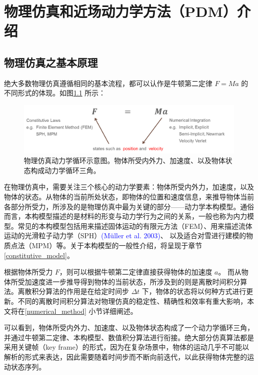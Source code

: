 ﻿\chapter{物理仿真和近场动力学方法（PDM）介绍}

\section{物理仿真之基本原理}
绝大多数物理仿真遵循相同的基本流程，都可以认作是牛顿第二定律 $F = Ma$ 的不同形式的体现。如图\ref{fig_physically_based_animation} 所示：
\begin{figure}[htbp!]
  \centering
  \captionsetup{justification=centering}
  \includegraphics[width=\linewidth]{chap/image/physically_based_animation}

  \caption{\label{fig_physically_based_animation}
           物理仿真动力学循环示意图。物体所受内外力、加速度、以及物体状态构成动力学循环三角。
          }
\end{figure}

在物理仿真中，需要关注三个核心的动力学要素：物体所受内外力，加速度，以及物体的状态。从物体的当前所处状态，即物体的位置和速度信息，来推导物体当前各部分所受力，所涉及的是物理仿真中最为关键的部分——动力学本构模型。通俗而言，本构模型描述的是材料的形变与动力学行为之间的关系，一般也称为内力模型。常见的本构模型包括用来描述固体运动的有限元方法（FEM）、用来描述流体运动的光滑粒子动力学（SPH）\textcolor{blue}{(M\"{u}ller et al. 2003)\supercite{Muller2003}}、 以及适合对雪进行建模的物质点法（MPM）等。关于本构模型的一般性介绍，将呈现于章节\ref{constitutive_model}。

根据物体所受力 $F$，则可以根据牛顿第二定律直接获得物体的加速度 $a$。 而从物体所受加速度进一步推导得到物体的当前状态，所涉及到的则是离散时间积分算法。离散积分算法的作用是在给定时间步 $\Delta t$ 下，物体的状态将以何种方式进行更新。不同的离散时间积分算法对物理仿真的稳定性、精确性和效率有重大影响，本文将在\ref{numerical_method} 小节详细阐述。

可以看到，物体所受内外力、加速度、以及物体状态构成了一个动力学循环三角，并通过牛顿第二定律、本构模型、数值积分算法进行衔接。绝大部分仿真算法都是采用关键帧（key frame）的形式，因为在复杂场景中，物体的运动几乎不可能以解析的形式来表达，因此需要随着时间步而不断向前迭代，以此获得物体完整的运动状态序列。

